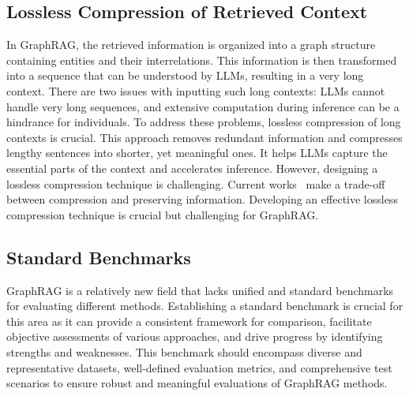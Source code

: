 \documentclass[acmsmall]{acmart}
\begin{document}
\subsection{Lossless Compression of Retrieved Context}
In GraphRAG, the retrieved information is organized into a graph structure containing entities and their interrelations. This information is then transformed into a sequence that can be understood by LLMs, resulting in a very long context. There are two issues with inputting such long contexts: LLMs cannot handle very long sequences, and extensive computation during inference can be a hindrance for individuals. To address these problems, lossless compression of long contexts is crucial. This approach removes redundant information and compresses lengthy sentences into shorter, yet meaningful ones. It helps LLMs capture the essential parts of the context and accelerates inference. However, designing a lossless compression technique is challenging. Current works~\cite{ref:kbqasurvey1,ref:kbqasurvey2} make a trade-off between compression and preserving information. Developing an effective lossless compression technique is crucial but challenging for GraphRAG.

\subsection{Standard Benchmarks}
GraphRAG is a relatively new field that lacks unified and standard benchmarks for evaluating different methods. Establishing a standard benchmark is crucial for this area as it can provide a consistent framework for comparison, facilitate objective assessments of various approaches, and drive progress by identifying strengths and weaknesses. This benchmark should encompass diverse and representative datasets, well-defined evaluation metrics, and comprehensive test scenarios to ensure robust and meaningful evaluations of GraphRAG methods.
\end{document}
